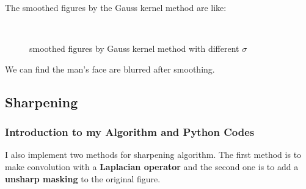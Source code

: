 \documentclass{article}
\begin{document}
The smoothed figures by the Gauss kernel method are like:
\begin{figure}[H]
    \centering
    \,    
    \,
    \,    
    \caption{smoothed figures by Gauss kernel method with different $\sigma$}
\end{figure}

We can find the man's face are blurred after smoothing.

\subsection{Sharpening}
\subsubsection{Introduction to my Algorithm and Python Codes}
I also implement two methods for sharpening algorithm.
The first method is to make convolution with a \textbf{Laplacian operator}
and the second one is to add a \textbf{unsharp masking} to the original figure.
\end{document}
